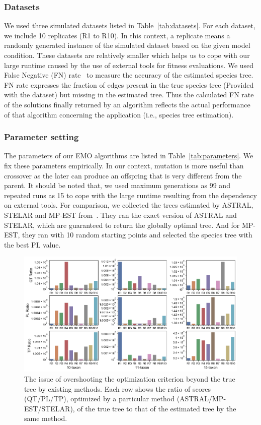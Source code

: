 \subsubsection{Datasets}
We used three simulated datasets listed in Table~\ref{tab:datasets}. For each dataset, we include 10 replicates (R1 to R10). In this
context, a replicate means a randomly generated instance of the simulated dataset based on the
 given model condition. These datasets are relatively smaller which helps us to cope with our large runtime caused by the use of external tools for fitness evaluations.
We used False Negative (FN) rate~\cite{bayzid2013naive} to measure the accuracy of the estimated species tree. FN rate expresses the fraction of edges present in the true species tree (Provided with the dataset) but missing in the estimated tree. Thus the calculated FN rate of the solutions finally returned by an algorithm reflects the actual performance of that algorithm concerning the application (i.e., species tree estimation).

\subsubsection{Parameter setting}
The parameters of our EMO algorithms are listed in Table~\ref{tab:parameters}. We fix these parameters empirically. In our context, mutation is more useful than crossover as the later can produce an offspring that is very different from the parent. It should be noted that, we used maximum generations as 99 and repeated runs as 15 to cope with the large runtime resulting from the dependency on external tools. 
For comparison, we collected the trees estimated by ASTRAL, STELAR and MP-EST from~\cite{islam2019stelar}. They ran the exact version of ASTRAL and STELAR, which are guaranteed to return the globally optimal tree. And for MP-EST, they ran with 10 random starting points and selected the species tree with the best PL value.   




\begin{figure}[!htbp]
\centering    
		\includegraphics[width=1\textwidth]{Figure/tool_ratio}
\caption{The issue of overshooting the optimization criterion beyond the true tree by existing methods. Each row shows the ratio of scores (QT/PL/TP), optimized by a particular method (ASTRAL/MP-EST/STELAR), of the true tree to that of the estimated tree by the same method.} \label{fig:tool_ratio}
\end{figure}


